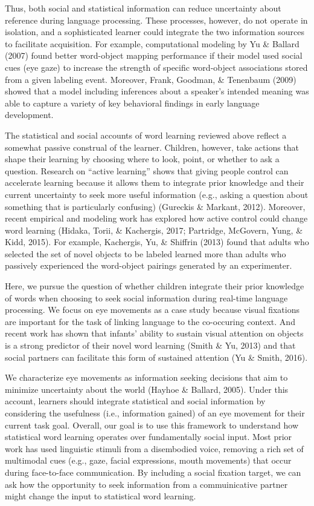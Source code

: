 \documentclass[10pt, letterpaper]{article}
\begin{document}
Thus, both social and statistical information can reduce uncertainty
about reference during language processing. These processes, however, do
not operate in isolation, and a sophisticated learner could integrate
the two information sources to facilitate acquisition. For example,
computational modeling by Yu \& Ballard (2007) found better word-object
mapping performance if their model used social cues (eye gaze) to
increase the strength of specific word-object associations stored from a
given labeling event. Moreover, Frank, Goodman, \& Tenenbaum (2009)
showed that a model including inferences about a speaker's intended
meaning was able to capture a variety of key behavioral findings in
early language development.

The statistical and social accounts of word learning reviewed above
reflect a somewhat passive construal of the learner. Children, however,
take actions that shape their learning by choosing where to look, point,
or whether to ask a question. Research on ``active learning'' shows that
giving people control can accelerate learning because it allows them to
integrate prior knowledge and their current uncertainty to seek more
useful information (e.g., asking a question about something that is
particularly confusing) (Gureckis \& Markant, 2012). Moreover, recent
empirical and modeling work has explored how active control could change
word learning (Hidaka, Torii, \& Kachergis, 2017; Partridge, McGovern,
Yung, \& Kidd, 2015). For example, Kachergis, Yu, \& Shiffrin (2013)
found that adults who selected the set of novel objects to be labeled
learned more than adults who passively experienced the word-object
pairings generated by an experimenter.

Here, we pursue the question of whether children integrate their prior
knowledge of words when choosing to seek social information during
real-time language processing. We focus on eye movements as a case study
because visual fixations are important for the task of linking language
to the co-occuring context. And recent work has shown that infants'
ability to sustain visual attention on objects is a strong predictor of
their novel word learning (Smith \& Yu, 2013) and that social partners
can facilitate this form of sustained attention (Yu \& Smith, 2016).

We characterize eye movements as information seeking decisions that aim
to minimize uncertainty about the world (Hayhoe \& Ballard, 2005). Under
this account, learners should integrate statistical and social
information by considering the usefulness (i.e., information gained) of
an eye movement for their current task goal. Overall, our goal is to use
this framework to understand how statistical word learning operates over
fundamentally social input. Most prior work has used linguistic stimuli
from a disembodied voice, removing a rich set of multimodal cues (e.g.,
gaze, facial expressions, mouth movements) that occur during
face-to-face communication. By including a social fixation target, we
can ask how the opportunity to seek information from a commuinicative
partner might change the input to statistical word learning.
\end{document}
